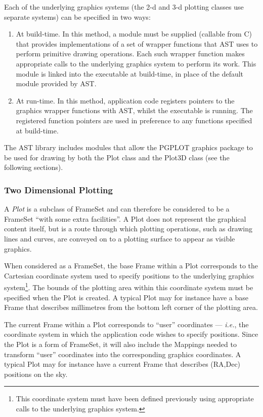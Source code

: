 \documentclass[final,authoryear,5p,times,twocolumn]{elsarticle}
\begin{document}
Each of the underlying graphics systems (the 2-d and 3-d plotting classes use
separate systems) can be specified in two ways:

\begin{enumerate}
\item At build-time. In this method, a module must be supplied (callable from
C) that provides implementations of a set of wrapper functions that AST
uses to perform primitive drawing operations. Each such wrapper function
makes appropriate calls to the underlying graphics system to perform its
work. This module is linked into the executable at build-time, in place
of the default module provided by AST.
\item At run-time. In this method, application code registers pointers to
the graphics wrapper functions with AST, whilst the executable is running.
The registered function pointers are used in preference to any functions
specified at build-time.
\end{enumerate}

The AST library includes modules that allow the PGPLOT
graphics package \citep[][]{1991BAAS...23..991P} to
be used for drawing by both the Plot class and the Plot3D class (see the
following sections).

\subsubsection{Two Dimensional Plotting}
A \emph{Plot} is a subclass of FrameSet and can therefore be considered
to be a FrameSet ``with some extra facilities''. A Plot does not represent
the graphical content itself, but is a route through which plotting
operations, such as drawing lines and curves, are conveyed on to a
plotting surface to appear as visible graphics.

When considered as a FrameSet, the base Frame within a Plot corresponds
to the Cartesian coordinate system used to specify positions to the
underlying graphics system\footnote{This coordinate system must have been
defined previously using appropriate calls to the underlying graphics
system.}. The bounds of the plotting area within this coordinate system must
be specified when the Plot is created. A typical Plot may for instance
have a base Frame that describes millimetres from the bottom left corner
of the plotting area.

The current Frame within a Plot corresponds to ``user''  coordinates ---
\emph{i.e.}, the coordinate system in which the application code wishes to
specify positions. Since the Plot is a form of FrameSet, it will also
include the Mappings needed to transform ``user'' coordinates into the
corresponding graphics coordinates. A typical Plot may for instance
have a current Frame that describes (RA,Dec) positions on the sky.
\end{document}
